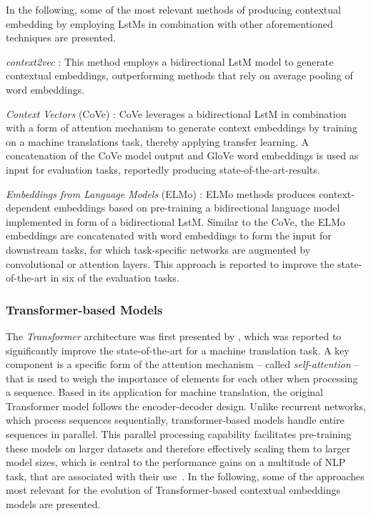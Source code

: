 \documentclass[11pt]{scrreprt}
\let\cite\parencite  %
\begin{document}
In the following, some of the most relevant methods of producing contextual embedding by employing
L\gls{st}Ms in combination with other aforementioned techniques are presented.

\textit{context2vec} \cite{melamudContext2vecLearningGeneric2016}: This method employs a bidirectional L\gls{st}M model to generate contextual embeddings, outperforming methods that rely on average pooling of word embeddings.

\textit{Context Vectors} (CoVe) \cite{mccannLearnedTranslationContextualized2018}: CoVe leverages a bidirectional L\gls{st}M in combination with a form of attention mechanism to generate context embeddings by training on a machine translations task, thereby applying transfer learning. A concatenation of the CoVe model output and GloVe word embeddings is used as input for evaluation tasks, reportedly producing state-of-the-art-results.

\textit{Embeddings from Language Models} (ELMo) \cite{petersDeepContextualizedWord2018}: ELMo methods produces context-dependent embeddings based on pre-training a bidirectional language model implemented in form of a bidirectional L\gls{st}M. Similar to the CoVe, the ELMo embeddings are concatenated with word embeddings to form the input for downstream tasks, for which task-specific networks are augmented by convolutional or attention layers. This approach is reported to improve the state-of-the-art in six of the evaluation tasks.



\subsubsection{Transformer-based Models}
The \textit{Transformer} architecture was first presented by \cite{vaswaniAttentionAllYou2017}, which was reported to significantly improve the state-of-the-art for a  machine translation task. A key component is a specific form of the attention mechanism -- called \textit{self-attention} -- that is used to weigh the importance of elements for each other when processing a sequence. Based in its application for machine translation, the original Transformer model follows the encoder-decoder design. Unlike recurrent networks, which process sequences sequentially, transformer-based models handle entire sequences in parallel. This parallel processing capability facilitates pre-training these models on larger datasets and therefore effectively scaling them to larger model sizes, which is central to the performance gains on a multitude of NLP task, that are associated with their use \cite{minRecentAdvancesNatural2023}. In the following, some of the approaches most relevant for the evolution of Transformer-based contextual embeddings models are presented.
\end{document}
